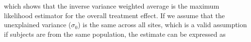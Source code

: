 which shows that the inverse variance weighted average is the maximum likelihood estimator for the overall treatment effect. If we assume that the unexplained variance ($\sigma_0$) is the same across all sites, which is a valid assumption if subjects are from the same population, the estimate can be expressed as